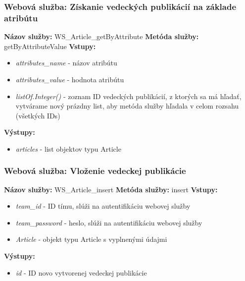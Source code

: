 \documentclass[10pt,oneside,slovak,a4paper]{article}
\begin{document}
\subsubsection{Webová služba: Získanie vedeckých publikácií na základe atribútu}
\textbf{Názov služby:} WS\_Article\_getByAttribute
\textbf{Metóda služby:} getByAttributeValue
\textbf{Vstupy:}
	\begin{itemize}
		\item \textit{attributes\_name} - názov atribútu
		\item \textit{attributes\_value} - hodnota atribútu
		\item \textit{listOf.Integer()} - zoznam ID vedeckých publikácií, z ktorých sa má hľadať, vytvárame nový prázdny list, aby metóda služby hľadala v celom rozsahu (všetkých IDs)
	\end{itemize}
\textbf{Výstupy:}
	\begin{itemize}
		\item \textit{articles} - list objektov typu Article
	\end{itemize}
	
\subsubsection{Webová služba: Vloženie vedeckej publikácie}
\textbf{Názov služby:} WS\_Article\_insert
\textbf{Metóda služby:} insert
\textbf{Vstupy:}
	\begin{itemize}
		\item \textit{team\_id} - ID tímu, slúži na autentifikáciu webovej služby
		\item \textit{team\_password} - heslo, slúži na autentifikáciu webovej služby
		\item \textit{Article} - objekt typu Article s vyplnenými údajmi
	\end{itemize}
\textbf{Výstupy:}
	\begin{itemize}
		\item \textit{id} - ID novo vytvorenej vedeckej publikácie
	\end{itemize}
	
\end{document}
